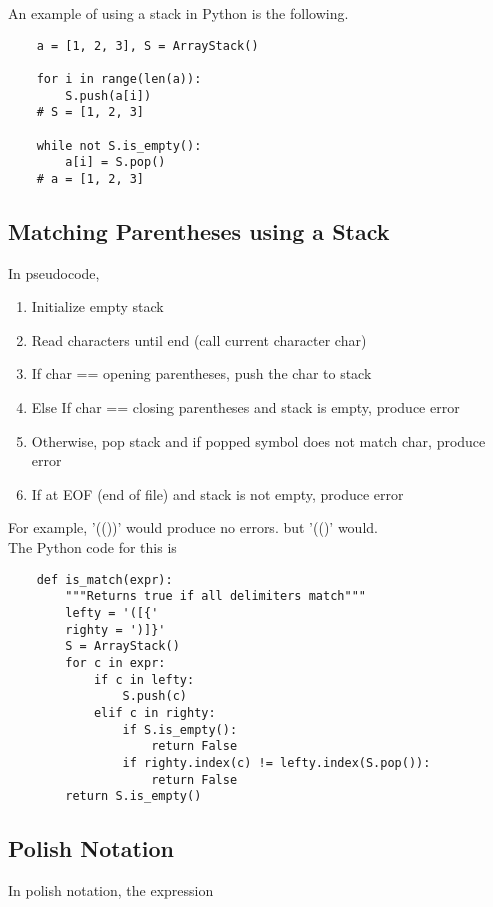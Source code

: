 \documentclass[]{article}
\begin{document}
An example of using a stack in Python is the following.

\begin{lstlisting}
	a = [1, 2, 3], S = ArrayStack()
	
	for i in range(len(a)):
		S.push(a[i])
	# S = [1, 2, 3]
	
	while not S.is_empty():
		a[i] = S.pop()
	# a = [1, 2, 3]
\end{lstlisting}\bigbreak

\subsection{Matching Parentheses using a Stack}\bigbreak

In pseudocode, 

\begin{enumerate}
	\item Initialize empty stack
	\item Read characters until end (call current character char)
	\item If char == opening parentheses, push the char to stack
	\item Else If char == closing parentheses and stack is empty, produce error
	\item Otherwise, pop stack and if popped symbol does not match char, produce error
	\item If at EOF (end of file) and stack is not empty, produce error
\end{enumerate}\bigbreak

For example, '(())' would produce no errors. but '(()' would.\\

The Python code for this is

\begin{lstlisting}
	def is_match(expr):
		"""Returns true if all delimiters match"""
		lefty = '([{'
		righty = ')]}'
		S = ArrayStack()
		for c in expr:
			if c in lefty:
				S.push(c)
			elif c in righty:
				if S.is_empty():
					return False
				if righty.index(c) != lefty.index(S.pop()):
					return False
		return S.is_empty()
\end{lstlisting}\bigbreak


\subsection{Polish Notation}\bigbreak

In polish notation, the expression 
\end{document}
